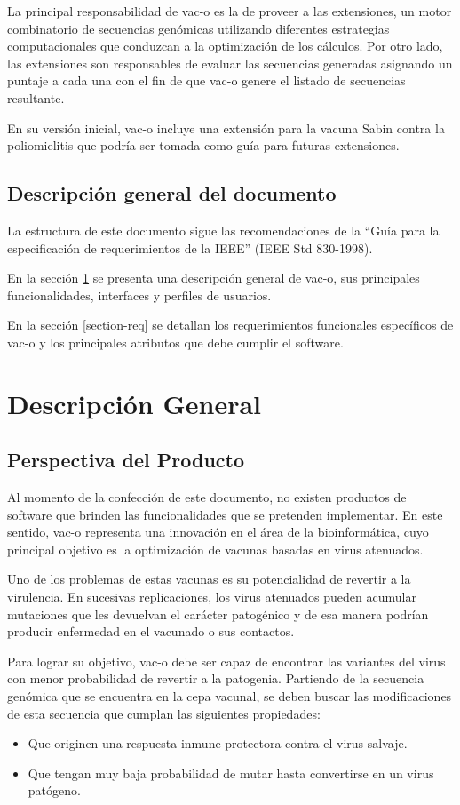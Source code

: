 \documentclass[10pt,a4paper]{article}
\begin{document}
  La principal responsabilidad de vac-o es la de proveer a las extensiones, un
motor combinatorio de secuencias gen\'omicas utilizando diferentes estrategias
computacionales que conduzcan a la optimizaci\'on de los c\'alculos. Por otro
lado, las extensiones son responsables de evaluar las secuencias generadas
asignando un puntaje a cada una con el fin de que vac-o genere el listado de
secuencias resultante.

  En su versi\'on inicial, vac-o incluye una extensi\'on para la vacuna Sabin
contra la poliomielitis que podr\'ia ser tomada como gu\'ia para futuras
extensiones.

  \subsection{Descripci\'on general del documento}
  La estructura de este documento sigue las recomendaciones de la ``Gu\'ia para
la especificaci\'on de requerimientos de la IEEE'' (IEEE Std 830-1998).

  En la secci\'on \ref{section-desc-gral} se presenta una descripci\'on general
de vac-o, sus principales funcionalidades, interfaces y perfiles de usuarios.
  
  En la secci\'on \ref{section-req} se detallan los requerimientos funcionales
espec\'ificos de vac-o y los principales atributos que debe cumplir el software.

\section{Descripci\'on General}
  \label{section-desc-gral}
  \subsection{Perspectiva del Producto}   
    Al momento de la confecci\'on de este documento, no existen productos de
software que brinden las funcionalidades que se pretenden implementar. En este
sentido, vac-o representa una innovaci\'on en el \'area de la bioinform\'atica,
cuyo principal objetivo es la optimizaci\'on de vacunas basadas en virus
atenuados.
    
    Uno de los problemas de estas vacunas es su potencialidad de revertir a la
virulencia. En sucesivas replicaciones, los virus atenuados pueden acumular
mutaciones que les devuelvan el car\'acter patog\'enico y de esa manera
podr\'ian producir enfermedad en el vacunado o sus contactos.
    
    Para lograr su objetivo, vac-o debe ser capaz de encontrar las variantes del
virus con menor probabilidad de revertir a la patogenia. Partiendo de la
secuencia gen\'omica que se encuentra en la cepa vacunal, se deben buscar las
modificaciones de esta secuencia que cumplan las siguientes propiedades:
    \begin{itemize}
      \item Que originen una respuesta inmune protectora contra el virus
salvaje.
      \item Que tengan muy baja probabilidad de mutar hasta convertirse en un
virus pat\'ogeno.
    \end{itemize}
    
\end{document}
